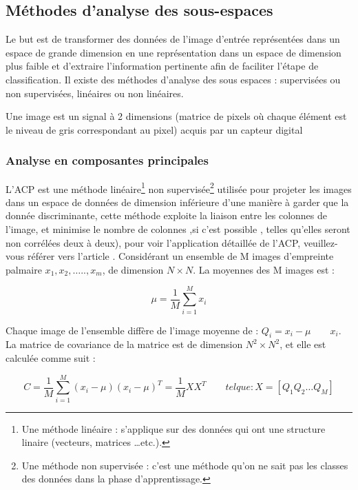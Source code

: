 \subsection{Méthodes d’analyse des sous-espaces }
Le but est de transformer des données de l’image d’entrée représentées dans un espace de grande dimension en une représentation dans un espace de dimension plus faible et d’extraire l’information pertinente afin de faciliter l’étape de classification. Il existe des méthodes d’analyse des sous espaces : supervisées ou non supervisées, linéaires ou non linéaires.

Une image est un signal à 2 dimensions (matrice de pixels où chaque élément est le niveau de gris correspondant au pixel) acquis par un capteur digital
\subsubsection{Analyse en composantes principales}
L’ACP est une méthode linéaire\footnote{Une méthode linéaire : s’applique sur des données qui ont une structure linaire (vecteurs, matrices …etc.).}  non supervisée\footnote{Une méthode non supervisée : c’est une méthode qu’on ne sait pas les classes des données dans la phase d’apprentissage.}  utilisée pour projeter les images dans un espace de données de dimension inférieure d’une manière à garder que la donnée discriminante, cette méthode exploite la liaison entre les colonnes de l’image, et minimise le nombre de colonnes ,si c’est possible , telles qu’elles seront non corrélées deux à deux), pour voir l'application détaillée de l’ACP, veuillez-vous référer vers l'article \citep{iitsuka2009palmprint}.
Considérant un ensemble de M images d’empreinte palmaire $ x_{1}, x_{2},…..,x_{m} $, de dimension $ N\times N $.
La moyennes des M images est :
\begin{center}
	\begin{equation}\label{eq:cn}
	\mu = \frac{1}{M}\sum_{i=1}^{M}x_{i}
	\end{equation}
\end{center}
	Chaque image de l’ensemble diffère de l’image moyenne de : $ Q_{i}=x_{i}-\mu \qquad {x_{i}} $.
	La matrice de covariance de la matrice est de dimension $N^{2} \times N^{2}$, et elle est calculée comme suit :
	\begin{center}
		\begin{equation}\label{eq:cn}
C = \frac{1}{M}\sum_{i=1}^{M}(x_{i}-\mu)(x_{i}-\mu)^{T}=\frac{1}{M}XX^{T} \qquad tel que :  \! X= [Q_{1} Q_{2}… Q_{M}]
		\end{equation}
	\end{center}

